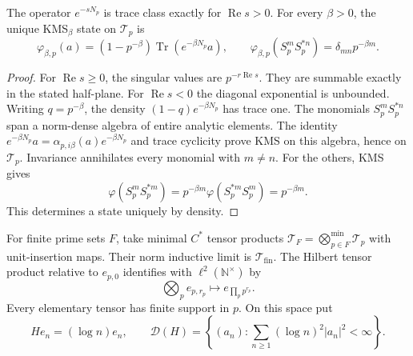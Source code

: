 \begin{proposition}
\label{syn-arith:prime-kms}
The operator $e^{-sN_p}$ is trace class exactly for $\operatorname{Re}s>0$.
For every $\beta>0$, the unique KMS$_\beta$ state on $\mathcal T_p$ is
\[
 \varphi_{\beta,p}(a)=(1-p^{-\beta})\operatorname{Tr}(e^{-\beta N_p}a),
 \qquad
 \varphi_{\beta,p}(S_p^mS_p^{*n})=\delta_{mn}p^{-\beta m}.
\]
\end{proposition}
\begin{proof}
For $\operatorname{Re}s\geq0$, the singular values are $p^{-r\operatorname{Re}s}$.
They are summable exactly in the stated half-plane.
For $\operatorname{Re}s<0$ the diagonal exponential is unbounded.
Writing $q=p^{-\beta}$, the density $(1-q)e^{-\beta N_p}$ has trace one.
The monomials $S_p^mS_p^{*n}$ span a norm-dense algebra of entire analytic elements.
The identity
$e^{-\beta N_p}a=\alpha_{p,i\beta}(a)e^{-\beta N_p}$
and trace cyclicity prove KMS on this algebra, hence on $\mathcal T_p$.
Invariance annihilates every monomial with $m\ne n$.
For the others, KMS gives
\[
 \varphi(S_p^mS_p^{*m})=p^{-\beta m}\varphi(S_p^{*m}S_p^m)=p^{-\beta m}.
\]
This determines a state uniquely by density.
\end{proof}

For finite prime sets $F$, take minimal $C^*$ tensor products
$\mathcal T_F=\bigotimes_{p\in F}^{\min}\mathcal T_p$ with unit-insertion maps.
Their norm inductive limit is $\mathcal T_{\mathrm{fin}}$.
The Hilbert tensor product relative to $e_{p,0}$ identifies with
$\ell^2(\mathbb N^\times)$ by
\[
 \bigotimes_pe_{p,r_p}\longmapsto e_{\prod_pp^{r_p}}.
\]
Every elementary tensor has finite support in $p$.
On this space put
\[
 He_n=(\log n)e_n,\qquad
 \mathcal D(H)=\left\{(a_n):\sum_{n\geq1}(\log n)^2|a_n|^2<\infty\right\}.
\]

